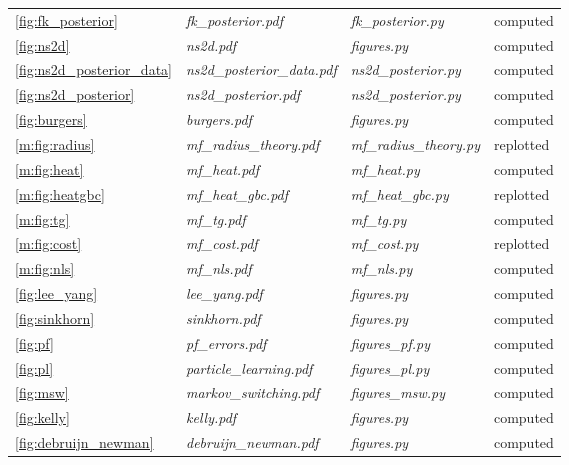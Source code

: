 \begin{table}[tp]
\begin{tabular}{llll}
\ref{fig:fk_posterior} & \textit{fk\_posterior.pdf} & \textit{fk\_posterior.py} & computed\\
\ref{fig:ns2d} & \textit{ns2d.pdf} & \textit{figures.py} & computed\\
\ref{fig:ns2d_posterior_data} & \textit{ns2d\_posterior\_data.pdf} & \textit{ns2d\_posterior.py} & computed\\
\ref{fig:ns2d_posterior} & \textit{ns2d\_posterior.pdf} & \textit{ns2d\_posterior.py} & computed\\
\ref{fig:burgers} & \textit{burgers.pdf} & \textit{figures.py} & computed\\
\ref{m:fig:radius} & \textit{mf\_radius\_theory.pdf} & \textit{mf\_radius\_theory.py} & replotted\\
\ref{m:fig:heat} & \textit{mf\_heat.pdf} & \textit{mf\_heat.py} & computed\\
\ref{m:fig:heatgbc} & \textit{mf\_heat\_gbc.pdf} & \textit{mf\_heat\_gbc.py} & replotted\\
\ref{m:fig:tg} & \textit{mf\_tg.pdf} & \textit{mf\_tg.py} & computed\\
\ref{m:fig:cost} & \textit{mf\_cost.pdf} & \textit{mf\_cost.py} & replotted\\
\ref{m:fig:nls} & \textit{mf\_nls.pdf} & \textit{mf\_nls.py} & computed\\
\ref{fig:lee_yang} & \textit{lee\_yang.pdf} & \textit{figures.py} & computed\\
\ref{fig:sinkhorn} & \textit{sinkhorn.pdf} & \textit{figures.py} & computed\\
\ref{fig:pf} & \textit{pf\_errors.pdf} & \textit{figures\_pf.py} & computed\\
\ref{fig:pl} & \textit{particle\_learning.pdf} & \textit{figures\_pl.py} & computed\\
\ref{fig:msw} & \textit{markov\_switching.pdf} & \textit{figures\_msw.py} & computed\\
\ref{fig:kelly} & \textit{kelly.pdf} & \textit{figures.py} & computed\\
\ref{fig:debruijn_newman} & \textit{debruijn\_newman.pdf} & \textit{figures.py} & computed\\
\bottomrule
\end{tabular}
\end{table}

